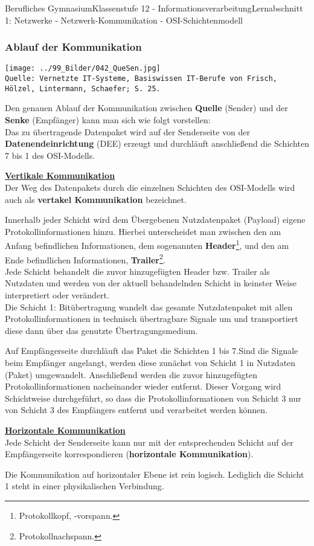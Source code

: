 \documentclass[11pt,oneside,openany,headings=optiontotoc,11pt,numbers=noenddot]{article}
\begin{document}
\begin{worksheet}{Berufliches Gymnasium}{Klassenstufe 12 - Informationsverarbeitung}{Lernabschnitt 1: Netzwerke - Netzwerk-Kommunikation - OSI-Schichtenmodell}
		\subsubsection{Ablauf der Kommunikation}
		\texttt{[image: ../99\_Bilder/042\_QueSen.jpg]}\\
		\tiny{\texttt{Quelle: Vernetzte IT-Systeme, Basiswissen IT-Berufe von Frisch, Hölzel, Lintermann, Schaefer; S. 25.}}\normalsize\\
		\par\noindent
		Den genauen Ablauf der Kommunikation zwischen \textbf{Quelle} (Sender) und der \textbf{Senke} (Empfänger) kann man sich wie folgt vorstellen:\\
		Das zu übertragende Datenpaket wird auf der Senderseite von der \textbf{Datenendeinrichtung} (DEE) erzeugt und durchläuft anschließend die Schichten 7 bis 1 des OSI-Modells.
		\begin{framed}
			\noindent
			\textbf{\underline{Vertikale Kommunikation}}\\Der Weg des Datenpakets durch die einzelnen Schichten des OSI-Modells wird auch als \textbf{vertakel Kommunikation} bezeichnet.
		\end{framed}
		\noindent
		Innerhalb jeder Schicht wird dem Übergebenen Nutzdatenpaket (Payload) eigene Protokollinformationen hinzu. Hierbei unterscheidet man zwischen den am Anfang befindlichen Informationen, dem sogenannten \textbf{Header}\footnote{Protokollkopf, -vorspann.}, und den am Ende befindlichen Informationen, \textbf{Trailer}\footnote{Protokollnachspann.}.\\
		Jede Schicht behandelt die zuvor hinzugefügten Header bzw. Trailer als Nutzdaten und werden von der aktuell behandelnden Schicht in keinster Weise interpretiert oder verändert.\\
		Die Schicht 1: Bitübertragung wandelt das gesamte Nutzdatenpaket mit allen Protokollinformationen in technisch übertragbare Signale um und transportiert diese dann über das genutzte Übertragungsmedium.\\
		\par\noindent
		Auf Empfängerseite durchläuft das Paket die Schichten 1 bis 7.Sind die Signale beim Empfänger angelangt, werden diese zunächst von Schicht 1 in Nutzdaten (Paket) umgewandelt. Anschließend werden die zuvor hinzugefügten Protokollinformationen nacheinander wieder entfernt. Dieser Vorgang wird Schichtweise durchgeführt, so dass die Protokollinformationen von Schicht 3 nur von Schicht 3 des Empfängers entfernt und verarbeitet werden können.
		\begin{framed}
			\noindent
			\textbf{\underline{Horizontale Kommunikation}}\\
			Jede Schicht der Senderseite kann nur mit der entsprechenden Schicht auf der Empfängerseite korrespondieren (\textbf{horizontale Kommunikation}).
		\end{framed}
		\noindent
		Die Kommunikation auf horizontaler Ebene ist rein logisch. Lediglich die Schicht 1 steht in einer physikalischen Verbindung.

\end{worksheet}
\end{document}
